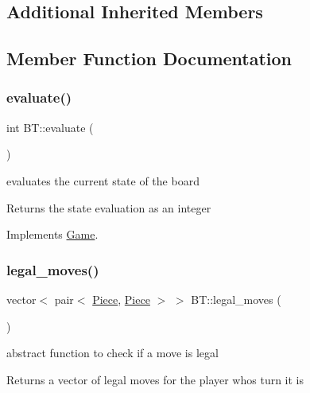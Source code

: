 \subsection*{Additional Inherited Members}


\subsection{Member Function Documentation}
\mbox{\label{class_b_t_a330840afc9271716265fb65eb037d351}} 
\subsubsection{\texorpdfstring{evaluate()}{evaluate()}}
{\footnotesize\ttfamily int B\+T\+::evaluate (\begin{DoxyParamCaption}{ }\end{DoxyParamCaption})\hspace{0.3cm}{\ttfamily [virtual]}}



evaluates the current state of the board 

\begin{DoxyReturn}{Returns}
the state evaluation as an integer 
\end{DoxyReturn}


Implements \hyperlink{class_game_a068b2b3012154457f362c90a80f46253}{Game}.

\mbox{\label{class_b_t_a4d3ad59ecb429b37c983986cc7802b17}} 
\subsubsection{\texorpdfstring{legal\+\_\+moves()}{legal\_moves()}}
{\footnotesize\ttfamily vector$<$ pair$<$ \hyperlink{class_piece}{Piece}, \hyperlink{class_piece}{Piece} $>$ $>$ B\+T\+::legal\+\_\+moves (\begin{DoxyParamCaption}{ }\end{DoxyParamCaption})\hspace{0.3cm}{\ttfamily [virtual]}}



abstract function to check if a move is legal 

\begin{DoxyReturn}{Returns}
a vector of legal moves for the player whos turn it is 
\end{DoxyReturn}


